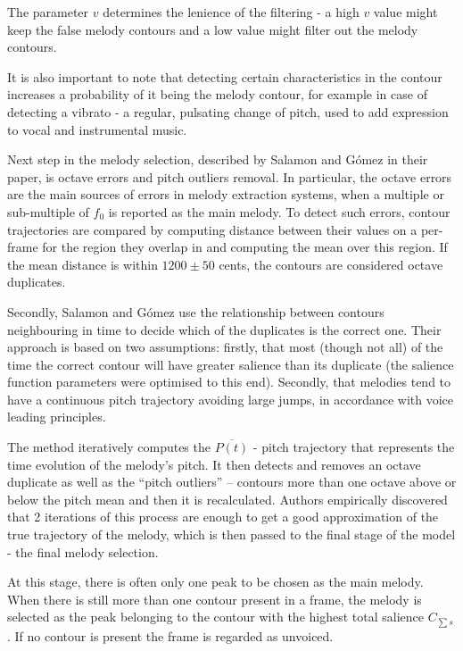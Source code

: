 The parameter $v$ determines the lenience of the filtering - a high $v$ value might keep the false melody contours and a low value might filter out the melody contours.

It is also important to note that detecting certain characteristics in the contour increases a probability of it being the melody contour, for example in case of detecting a vibrato -  a regular, pulsating change of pitch, used to add expression to vocal and instrumental music. \cite{vibrato}

Next step in the melody selection, described by Salamon and G\'{o}mez in their paper, is octave errors and pitch outliers removal. In particular, the octave errors are the main sources of errors in melody extraction systems, when a multiple or sub-multiple of $f_{0}$ is reported as the main melody. To detect such errors, contour trajectories are compared by computing distance between their values on a per-frame for the region they overlap in and computing the mean over this region. If the mean distance is within $1200\pm50$ cents, the contours are considered octave duplicates.

Secondly, Salamon and G\'{o}mez use the relationship between contours neighbouring in time to decide which of the duplicates is the correct one. Their approach is based on two assumptions: firstly, that most (though not all) of the time the correct contour will have greater salience than its duplicate (the salience function parameters were optimised to this end). Secondly, that melodies tend to have a continuous pitch trajectory avoiding large jumps, in accordance with voice leading principles.

The method iteratively computes the $\overline{P(t)}$ - pitch trajectory that represents the time evolution of the melody's pitch. It then detects and removes an octave duplicate as well as  the ``pitch outliers'' – contours more than one octave above or below the pitch mean and then it is recalculated. Authors empirically discovered that 2 iterations of this process are enough to get a good approximation of the true trajectory of the melody, which is then passed to the final stage of the model - the final melody selection.

At this stage, there is often only one peak to be chosen as the main melody. When there is still more than one contour present in a frame, the melody is selected as the peak belonging to the contour with the highest total salience $C_{\sum s}$. If no contour is present the frame is regarded as unvoiced.

